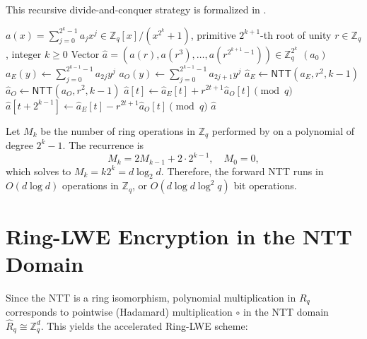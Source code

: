 This recursive divide-and-conquer strategy is formalized in .

\begin{algorithm}[H]
    \caption{Fast Number Theoretic Transform (Forward NTT)}\label{alg:ntt}
    \begin{algorithmic}[1]
        \Require \(a(x) = \sum_{j=0}^{2^k - 1} a_j x^j \in \mathbb{Z}_q[x] / (x^{2^k} + 1)\), primitive \(2^{k+1}\)-th root of unity \(r \in \mathbb{Z}_q\), integer \(k \ge 0\)
        \Ensure Vector \(\hat{a} = \left( a(r), a(r^3), \dots, a(r^{2^{k+1}-1}) \right) \in \mathbb{Z}_q^{2^k}\)
            \State \Return \(\left( a_0 \right)\)
        \EndIf
        \State \(a_E(y) \gets \sum_{j=0}^{2^{k-1} - 1} a_{2j} y^j\)
        \State \(a_O(y) \gets \sum_{j=0}^{2^{k-1} - 1} a_{2j+1} y^j\)
        \State \(\hat{a}_E \gets \mathsf{NTT}(a_E, r^2, k - 1)\)
        \State \(\hat{a}_O \gets \mathsf{NTT}(a_O, r^2, k - 1)\)
            \State \(\hat{a}[t] \gets \hat{a}_E[t] + r^{2t+1} \hat{a}_O[t] \pmod q\)
            \State \(\hat{a}[t + 2^{k-1}] \gets \hat{a}_E[t] - r^{2t+1} \hat{a}_O[t] \pmod q\)
        \EndFor
        \State \Return \(\hat{a}\)
    \end{algorithmic}
\end{algorithm}

Let \(M_k\) be the number of ring operations in \(\mathbb{Z}_q\) performed by  on a polynomial of degree \(2^k - 1\).
The recurrence is
\[
    M_k = 2M_{k-1} + 2 \cdot 2^{k-1}, \quad M_0 = 0,
\]
which solves to \(M_k = k 2^k = d \log_2 d\).
Therefore, the forward NTT runs in \(O(d \log d)\) operations in \(\mathbb{Z}_q\), or \(O(d \log d \log^2 q)\) bit operations.

\section*{Ring-LWE Encryption in the NTT Domain}

Since the NTT is a ring isomorphism, polynomial multiplication in \(R_q\) corresponds to pointwise (Hadamard) multiplication \(\circ\) in the NTT domain \(\hat{R}_q \cong \mathbb{Z}_q^d\).
This yields the accelerated Ring-LWE scheme:

